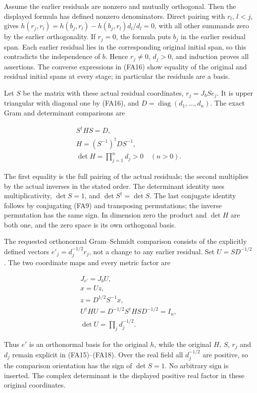 \documentclass[
  11pt,
]{article}
\begin{document}
Assume the earlier residuals are nonzero and mutually orthogonal. Then
the displayed formula has defined nonzero denominators. Direct pairing
with \(r_l\), \(l<j\), gives
\(h(r_j,r_l)=h(b_j,r_l)-h(b_j,r_l)d_l/d_l=0\), with all other summands
zero by the earlier orthogonality. If \(r_j=0\), the formula puts
\(b_j\) in the earlier residual span. Each earlier residual lies in the
corresponding original initial span, so this contradicts the
independence of \(b\). Hence \(r_j\ne0\), \(d_j>0\), and induction
proves all assertions. The converse expressions in (FA16) show equality
of the original and residual initial spans at every stage; in particular
the residuals are a basis.

Let \(S\) be the matrix with these actual residual coordinates,
\(r_j=J_bS e_j\). It is upper triangular with diagonal one by (FA16),
and \(D=\operatorname{diag}(d_1,\ldots,d_n)\). The exact Gram and
determinant comparisons are

\[
\begin{gathered}
S^\dagger HS=D, \\  H=(S^{-1})^\dagger DS^{-1}, \\ \det H=\prod_{j=1}^n d_j>0\quad(n>0).
\end{gathered}
\tag{FA17}
\]

The first equality is the full pairing of the actual residuals; the
second multiplies by the actual inverses in the stated order. The
determinant identity uses multiplicativity, \(\det S=1\), and
\(\det S^\dagger=\overline{\det S}\). The last conjugate identity
follows by conjugating (FA9) and transposing permutations; the inverse
permutation has the same sign. In dimension zero the product and
\(\det H\) are both one, and the zero space is its own orthogonal basis.

The requested orthonormal Gram--Schmidt comparison consists of the
explicitly defined vectors \(e'_j=d_j^{-1/2}r_j\), not a change to any
earlier residual. Set \(U=S D^{-1/2}\). The two coordinate maps and
every metric factor are

\[
\begin{gathered}
J_{e'}=J_b U, \\  x=Uz, \\ 
z=D^{1/2}S^{-1}x, \\ 
U^\dagger HU=D^{-1/2}S^\dagger HS D^{-1/2}=I_n, \\ \det U=\prod_j d_j^{-1/2}.
\end{gathered}
\tag{FA18}
\]

Thus \(e'\) is an orthonormal basis for the original \(h\), while the
original \(H\), \(S\), \(r_j\) and \(d_j\) remain explicit in
(FA15)--(FA18). Over the real field all \(d_j^{-1/2}\) are positive, so
the comparison orientation has the sign of \(\det S=1\). No arbitrary
sign is inserted. The complex determinant is the displayed positive real
factor in these original coordinates.
\end{document}
